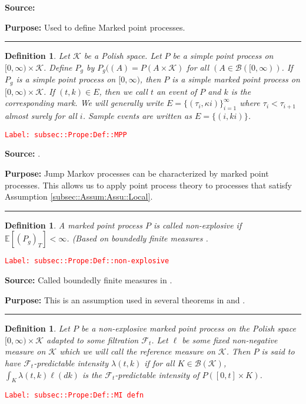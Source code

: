 \documentclass[12pt]{article}
\newcommand{\mb}{\mathbb}
\newcommand{\mc}{\mathcal}
\newcommand{\ms}{\mathscr}
\newcommand{\tr}{\textcolor{red}}
\newcommand{\labe}[1]{\tr{\texttt{Label: #1}}}
\newcommand{\purpose}{\textbf{Purpose: }}
\newcommand{\lin}{\rule{\linewidth}{0.4 pt}}
\newcommand{\ex}[1]{\mb{E}\left[#1\right]}			%
\renewcommand{\t}{t}							%
\newcommand{\F}{\mc{F}}							%
\newcommand{\ts}[1]{_{#1}}						%
\newcommand{\rate}{\lambda}						%
\newcommand{\indx}[1]{_{#1}}					%
\newcommand{\rt}{\tau}							%
\renewcommand{\mark}{\kappa}					%
\newcommand{\rp}{P}								%
\newcommand{\typset}{A}							%
\newcommand{\evs}{E}							%
\newcommand{\mspce}{\mc{K}}						%
\newcommand{\rpg}{\rp_g}						%
\newtheorem{defn}[thms]{Definition}
\begin{document}
\textbf{Source: }\cite[Definition 9.1.II]{DalVer08}

\purpose Used to define Marked point processes.

\lin

\begin{defn}
Let \(\mspce\) be a Polish space. Let \(\rp\) be a simple point process on \([0,\infty)\times \mspce\). Define \(\rpg\) by \(\rpg((\typset) = \rp(\typset\times \mspce)\) for all \((\typset \in \ms{B}([0,\infty))\). If \(\rpg\) is a simple point process on \([0,\infty)\), then \(\rp\) is a simple marked point process on \([0,\infty)\times \mspce\). If \((\t,k) \in \evs\), then we call \(\t\) an event of \(\rp\) and \(k\) is the corresponding mark. We will generally write \(\evs = \{(\rt\indx{i},\mark{i})\}_{i=1}^{\infty}\) where \(\rt\indx{i} < \rt\indx{i+1}\) almost surely for all \(i\). Sample events are written as \(\evs = \{(	{i},k{i})\}\). 
\label{subsec::Prope:Def::MPP}
\end{defn}
\labe{subsec::Prope:Def::MPP}

\textbf{Source: }\cite[Definition 6.4.I]{DalVer03}.

\purpose Jump Markov processes can be characterized by marked point processes. This allows us to apply point process theory to processes that satisfy Assumption \ref{subsec::Assum:Assu::Local}.

\lin

\begin{defn}
A marked point process \(\rp\) is called non-explosive if \(\ex{(\rpg)_T} < \infty\). (Based on boundedly finite measures \cite[Definition 9.1.I]{DalVer08}.
\label{subsec::Prope:Def::non-explosive}
\end{defn}
\labe{subsec::Prope:Def::non-explosive}

\textbf{Source: } Called boundedly finite measures in \cite[Definition 9.1.I]{DalVer08}.

\purpose This is an assumption used in several theorems in \cite{DalVer03} and \cite{DalVer08}.

\lin

\begin{defn}
Let \(\rp\) be a non-explosive marked point process on the Polish space \([0,\infty)\times \mspce\) adapted to some filtration \(\F\ts{\t}\). Let \(\ell\) be some fixed non-negative measure on \(\mspce\) which we will call the reference measure on \(\mspce\). Then \(\rp\) is said to have \(\F\ts{\t}\)-predictable intensity \(\rate(\t,k)\) if for all \(K \in \ms{B}(\mspce)\), \(\int_K \rate(\t,k)\ell(dk)\) is the \(\F\ts{\t}\)-predictable intensity of \(\rp([0,\t]\times K)\). 
\label{subsec::Prope:Def::MI defn}
\end{defn}
\labe{subsec::Prope:Def::MI defn}
\end{document}

